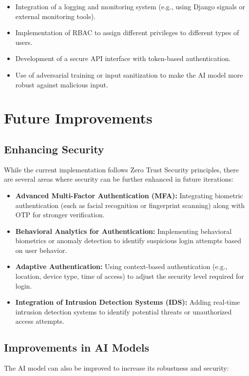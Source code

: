 \documentclass[a4paper,12pt]{article}
\begin{document}
\begin{itemize}
    \item Integration of a logging and monitoring system (e.g., using Django signals or external monitoring tools).
    \item Implementation of RBAC to assign different privileges to different types of users.
    \item Development of a secure API interface with token-based authentication.
    \item Use of adversarial training or input sanitization to make the AI model more robust against malicious input.
\end{itemize}


\section{Future Improvements}

\subsection{Enhancing Security}
While the current implementation follows Zero Trust Security principles, there are several areas where security can be further enhanced in future iterations:

\begin{itemize}
    \item \textbf{Advanced Multi-Factor Authentication (MFA):} Integrating biometric authentication (such as facial recognition or fingerprint scanning) along with OTP for stronger verification.
    \item \textbf{Behavioral Analytics for Authentication:} Implementing behavioral biometrics or anomaly detection to identify suspicious login attempts based on user behavior.
    \item \textbf{Adaptive Authentication:} Using context-based authentication (e.g., location, device type, time of access) to adjust the security level required for login.
    \item \textbf{Integration of Intrusion Detection Systems (IDS):} Adding real-time intrusion detection systems to identify potential threats or unauthorized access attempts.
\end{itemize}

\subsection{Improvements in AI Models}
The AI model can also be improved to increase its robustness and security:
\end{document}
